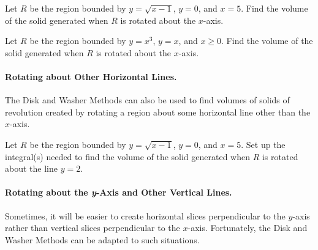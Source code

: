 \documentclass[12pt]{article}
\begin{document}
\newpage 



\Example Let $R$ be the region bounded by $y=\sqrt{x-1}$, $y=0$, and $x=5$. Find the volume of the solid generated when $R$ is rotated about the $x$-axis.

\newpage

\Example Let $R$ be the region bounded by $y=x^3$, $y=x$, and $x\geq 0$. Find the volume of the solid generated when $R$ is rotated about the $x$-axis.

\vfill


\newpage

\paragraph{Rotating about Other Horizontal Lines.} The Disk and Washer Methods can also be used to find  volumes of solids of revolution created by rotating a region about some horizontal line other than the $x$-axis.

\Example Let $R$ be the region bounded by $y=\sqrt{x-1}$, $y=0$, and $x=5$. Set up the integral(s) needed to find the volume of the solid generated when $R$ is rotated about the line $y=2$.

\newpage

\paragraph{Rotating about the \textbf{\textit{y}}-Axis and Other Vertical Lines.} Sometimes, it will be easier to create horizontal slices perpendicular to the $y$-axis rather than vertical slices perpendicular to the $x$-axis. Fortunately, the Disk and Washer Methods can be adapted to such situations.
\end{document}
